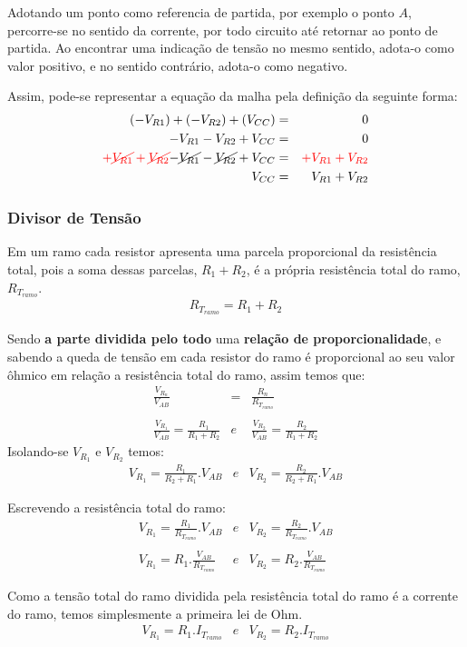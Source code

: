 Adotando um ponto como referencia de partida, por exemplo o ponto $A$, percorre-se no sentido da corrente, por todo circuito até retornar ao ponto de partida. Ao encontrar uma indicação de tensão no mesmo sentido, adota-o como valor positivo, e no sentido contrário, adota-o como negativo.

Assim, pode-se representar a equação da malha pela definição da seguinte forma:
\begin{eqnarray}
	(-V_{R1}) + (-V_{R2}) + (V_{CC})  & = & 0 \\
	-V_{R1} - V_{R2} + V_{CC} & = & 0 \nonumber\\
	\color{red}{ + \cancel{ V_{R1} } + \cancel{ V_{R2} } } \color{black}{- \cancel{V_{R1}} } - \color{black}{\cancel{ V_{R2}} } + V_{CC} & = & \color{red}{+ V_{R1} + V_{R2}} \nonumber\\
	 V_{CC} & = & V_{R1} + V_{R2}
\end{eqnarray}





\subsubsection{Divisor de Tensão}
Em um ramo cada resistor apresenta uma parcela proporcional da resistência total, pois a soma dessas parcelas, $R_1 + R_2$, é a própria resistência total do ramo, $R_{T_{ramo}}$.
\begin{eqnarray}
R_{T_{ramo}} = R_1 + R_2
\end{eqnarray}

Sendo \textbf{a parte dividida pelo todo} uma \textbf{relação de proporcionalidade}, e sabendo a queda de tensão em cada resistor do ramo é proporcional ao seu valor ôhmico em relação a resistência total do ramo, assim temos que:
\begin{eqnarray}
\frac{V_{R_n}}{V_{AB}} & = & \frac{R_n}{R_{T_{ramo}}} \\
\nonumber\\
\frac{V_{R_1}}{V_{AB}} = \frac{R_1}{R_1+R_2} & e &
\frac{V_{R_2}}{V_{AB}} = \frac{R_2}{R_1+R_2}
\end{eqnarray}
Isolando-se $V_{R_1}$  e $V_{R_2}$ temos:
\begin{eqnarray}
V_{R_1} = \frac{R_1}{R_2 + R_1} . V_{AB} & e &
V_{R_2} = \frac{R_2}{R_2 + R_1} . V_{AB}
\end{eqnarray}

Escrevendo a resistência total do ramo:
\begin{eqnarray}
	V_{R_1} = \frac{R_1}{R_{T_{ramo}}} . V_{AB} & e &
	V_{R_2} = \frac{R_2}{R_{T_{ramo}}} . V_{AB} \nonumber\\
	\nonumber\\
	V_{R_1} = R_1.\frac{V_{AB}}{ R_{T_{ramo}}} & e &
	V_{R_2} = R_2.\frac{V_{AB}}{ R_{T_{ramo}}} \nonumber
\end{eqnarray}

Como a tensão total do ramo dividida pela resistência total do ramo é a corrente do ramo, temos simplesmente a primeira lei de Ohm.
\begin{eqnarray}
	V_{R_1} = R_1.I_{T_{ramo}} & e &
	V_{R_2} = R_2.I_{T_{ramo}} \nonumber
\end{eqnarray}
